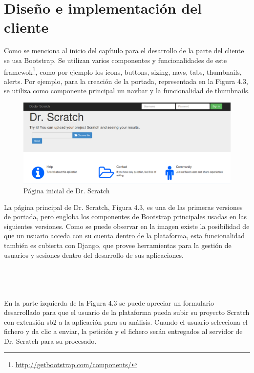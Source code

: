 \documentclass[a4paper, 12pt]{book}
\begin{document}
\section{Diseño e implementación del cliente}
\label{sec:servidor}

Como se menciona al inicio del capítulo para el desarrollo de la parte del cliente se usa
Bootstrap. Se utilizan varios componentes y funcionalidades de este
 framewok\footnote{\url{http://getbootstrap.com/components/}}, como por ejemplo los icons,
buttons, sizing, navs, tabs, thumbnails, alerts. Por ejemplo, para la creación de la 
portada, representada en la Figura 4.3, se utiliza como componente principal un navbar y la
funcionalidad de thumbnails. \\

 \begin{figure}
		\graphicspath{{img/}}
    \includegraphics[bb=0 0 800 600, width=14cm, keepaspectratio]{portada.png}
		\caption{Página inicial de Dr. Scratch}
    \label{figura:foro_hilos}
 \end{figure} 

La página principal de Dr. Scratch, Figura 4.3, es una de las primeras 
versiones de portada, pero engloba los componentes de Bootstrap principales 
usadas en las siguientes versiones. Como se puede observar en la imagen existe la 
posibilidad de que un usuario acceda con su cuenta dentro de la plataforma, esta
funcionalidad también es cubierta con Django, que provee herramientas para la 
gestión de usuarios y sesiones dentro del desarrollo de sus aplicaciones. \\ \\ \\ \\ \\

En la parte izquierda de la Figura 4.3 se puede apreciar un formulario desarrollado
para que el usuario de la plataforma pueda subir su proyecto Scratch con extensión sb2
a la aplicación para su análisis. Cuando el usuario selecciona el fichero y da clic
a enviar, la petición y el fichero serán entregados al servidor de Dr. Scratch para
su procesado. \\
\end{document}
